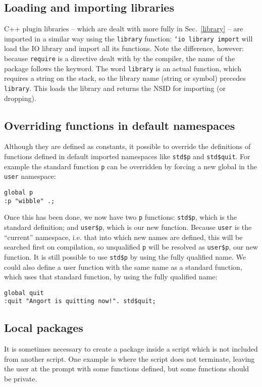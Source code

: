 \subsection{Loading and importing libraries}
C++ plugin libraries -- which are dealt with more fully in Sec.~\ref{library} -- are
imported in a similar way using the \texttt{library} function:
\texttt{`io library import} 
will load the IO library and import all its functions. Note the difference, however:
because \texttt{require} is a directive dealt with by the compiler, the name of the package
follows the keyword. The word \texttt{library} is an actual function, which requires a string
on the stack, so the library name (string or symbol) precedes \texttt{library}.
This loads the library and returns the NSID for importing (or dropping).

\subsection{Overriding functions in default namespaces}
Although they are defined as constants, it possible to override the definitions of functions defined
in default imported namespaces
like \texttt{std\$p} and \texttt{std\$quit}. For example the standard function \texttt{p}
can be overridden by forcing a
new global in the \texttt{user} namespace:
\begin{lstlisting}
global p
:p "wibble" .;
\end{lstlisting}
Once this has been done, we now have two \texttt{p} functions: \texttt{std\$p}, which is
the standard definition; and \texttt{user\$p}, which is our new function. Because \texttt{user} is
the ``current'' namespace, i.e. that into which new names are defined, this will be searched
first on compilation, so unqualified \texttt{p} will be resolved as \texttt{user\$p}, our new function.
It is still possible to use \texttt{std\$p} by using the fully qualified name. We could also
define a user function with the same name as a standard function, which uses that standard function,
by using the fully qualified name:
\begin{lstlisting}
global quit
:quit "Angort is quitting now!". std$quit;
\end{lstlisting}
 


\subsection{Local packages}
\label{localpack}
It is sometimes necessary to create a package inside a script which
is not included from another script. One example is where the script
does not terminate, leaving the user at the prompt with some functions defined,
but some functions should be private.

